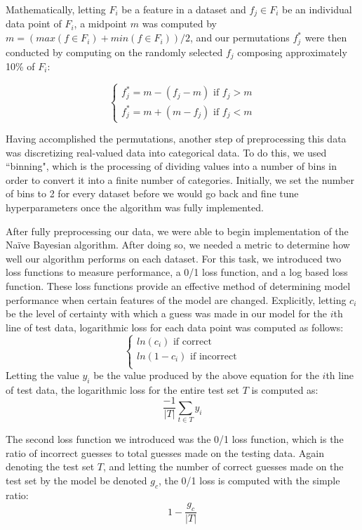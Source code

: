 \documentclass[twoside,11pt]{article}
\begin{document}
Mathematically, letting $F_i$ be a feature in a dataset and $f _j\in F_i$ be an individual data point of $F_i$, a midpoint $m$ was computed by
$m = (max(f \in F_i) + min(f \in F_i))/2$, and our permutations $f_j^*$ were then conducted by computing on the randomly selected $f_j$
composing approximately 10\% of $F_i$:

\[\begin{cases}
	f_j^*=m-(f_j-m) \text{ if $f_j > m$}\\
	f_j^*=m+(m-f_j) \text{ if $f_j < m$}
	\end{cases}\]

	
Having accomplished the permutations, another step of preprocessing this data was discretizing real-valued data into categorical data. To do this, we used ``binning", 
which is the processing of dividing values into a number of bins in order to convert it into a finite number of categories. Initially, we
set the number of bins to 2 for every dataset before we would go back and fine tune hyperparameters once the algorithm was fully implemented.

After fully preprocessing our data, we were able to begin implementation of the Na{\"i}ve Bayesian algorithm. After doing so, we needed a metric to determine how well 
our algorithm performs on each dataset. For this task, we introduced two loss functions to measure performance, a 0/1 loss function, and a log based loss function. 
These loss functions provide an effective method of determining model performance when certain features of the model are changed. Explicitly, letting $c_i$ be the level 
of certainty with which a guess was made in our model for the $i$th line of test data, logarithmic loss for each data point was computed as follows:
\[\begin{cases}
	ln(c_i) \text{ if correct}\\
	ln(1-c_i) \text{ if incorrect}\\
\end{cases}\]
Letting the value $y_i$ be the value produced by the above equation for the $i$th line of test data, the logarithmic loss  for the entire test set $T$ is computed
as:
\begin{equation}
\frac{-1}{|T|}\sum_{t \in T}^{ } y_i
\end{equation}

The second loss function we introduced was the 0/1 loss function, which is the ratio of incorrect guesses to total guesses made on the testing data.
Again denoting the test set $T$, and letting the number of correct guesses made on the test set by the model be denoted $g_c$, the 0/1 loss is computed with the simple ratio:
\begin{equation}
	1 - \frac{g_c}{|T|}
\end{equation}
\end{document}
